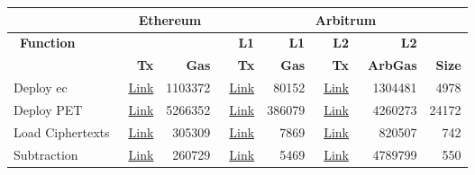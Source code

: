 
\begin{table}[t]
	\centering
	\begin{tabular}{|l|r|r|r|r|r|r|r|}
		\hline
		&    \multicolumn{2}{c|}{~\textbf{Ethereum}} & \multicolumn{5}{c|}{~\textbf{Arbitrum}} \\ \hline
		~\textbf{Function}  &  &    & ~\textbf{ L1} & ~\textbf{L1}  & ~\textbf{L2} &~\textbf{L2}&  \\ 
		&~\textbf{Tx} &~\textbf{Gas}  &~\textbf{Tx} &  ~\textbf{Gas} & ~\textbf{Tx}&~\textbf{ArbGas}&~\textbf{Size}  \\ 
		\hline
		Deploy ec &  ~\href{https://kovan.etherscan.io/tx/0x088af056a640c1fe2188678e52484f89b7ba0bd9345bb0578d91c96aa480c59c}{Link}& 1103372& ~\href{https://kovan.etherscan.io/tx/0xa80f0eb0408f8f1c760abbc223b6a3b24780aba4b85f96ecbd6fb0dfe94bd606}{Link}&80152& ~\href{https://explorer.offchainlabs.com/#/tx/0x7c82717b52cb133c8855c0833d3cbf9ded19f884764fce78de3bb4e27feb63cd}{Link}&1304481&4978\\  \cline{1-8}
		
		Deploy PET &  ~\href{https://kovan.etherscan.io/tx/0xb76cda2c91907234afc0b971df893a6dbcdf83d482d2ff3d7d29b4a0b313002f}{Link}&5266352& ~\href{https://kovan.etherscan.io/tx/0x2ec73b92474c991d7b9f8ad1c46f95ef9125513897badb0c0c5faa19bd5b9a55}{Link}&386079& ~\href{https://explorer.offchainlabs.com/#/tx/0x2b1e63c81ca8ab7f4a6fe5333daab515a4e7408121771ae58e205ee037bceb50}{Link}&4260273&24172\\  \cline{1-8}
		
		Load Ciphertexts  & ~\href{https://kovan.etherscan.io/tx/0x2cb4bf0f6ce9fc7cabf0c152fdc61ccfff00a0f2e717c85da7eab806fa101b5b}{Link}&305309 &  \href{https://kovan.etherscan.io/tx/0x612e19481fff4ddd1c2dfe260908f15c7c74072a1e733597b4bab1c1209169f4}{Link}& 7869 &\href{https://explorer.offchainlabs.com/#/tx/0x28b3fa1a91d6d6e13005d352940861a026ac029fbc13a58dc969e98ffb5b392c}{Link} &  820507& 742\\  \cline{1-8}
		
		Subtraction & ~\href{https://kovan.etherscan.io/tx/0x6eeb3031c81af252df1fb806ae0a57643c20792df7336004465c6a74792c0016}{Link}&260729 & ~\href{https://kovan.etherscan.io/tx/0xa31a5653f3bfbdf7bcce4520c2a4f0e8d38fbc5c19036548199f805a4997cf68}{Link} & 5469& ~\href{https://explorer.offchainlabs.com/#/tx/0xbeff60af08f1b88deabe690322e26794d87595b332f1f1d01095a6a4528c4254}{Link} & 4789799& 550\\  \cline{1-8}
		

\end{tabular}
\end{table}
